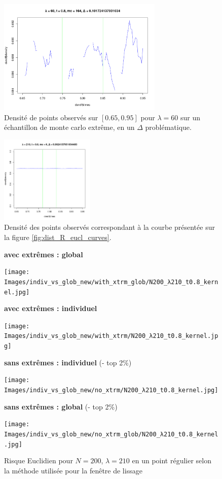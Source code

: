 \begin{figure}[H]
	\centering
	\includegraphics[width=0.7\textwidth]{Images/indiv_vs_glob/Tdensity_lbd60_mc164.png}
	\caption{Densité de points observés sur $[0.65, 0.95]$ pour $\lambda = 60$ sur un échantillon de monte carlo extrême, en un $\Delta$ problématique.}
	\label{fig:den_ex}
\end{figure}


\begin{figure}[H]
	\centering
	\includegraphics[width=0.4\textwidth]{Images/indiv_vs_glob/worst_210_67_mc6.png}
	\caption{Densité des points observés correspondant à la courbe présentée sur la figure \ref{fig:dist_R_eucl_curves}.}
	\label{fig:den_counterex}
\end{figure}

\begin{figure}[H]
	\centering

	\textbf{avec extrêmes : global}

	\texttt{[image: Images/indiv\_vs\_glob\_new/with\_xtrm\_glob/N200\_λ210\_t0.8\_kernel.jpg]}

	\textbf{avec extrêmes : individuel}

	\texttt{[image: Images/indiv\_vs\_glob\_new/with\_xtrm/N200\_λ210\_t0.8\_kernel.jpg]}

	\textbf{sans extrêmes : individuel} (- top 2\%)

	\texttt{[image: Images/indiv\_vs\_glob\_new/no\_xtrm/N200\_λ210\_t0.8\_kernel.jpg]}

	\textbf{sans extrêmes : global} (- top 2\%)

	\texttt{[image: Images/indiv\_vs\_glob\_new/no\_xtrm\_glob/N200\_λ210\_t0.8\_kernel.jpg]}
	\caption{Risque Euclidien pour $N=200$, $\lambda=210$ en un point régulier selon la méthode utilisée pour la fenêtre de lissage}
	\label{fig:compare_xtrm}
\end{figure}